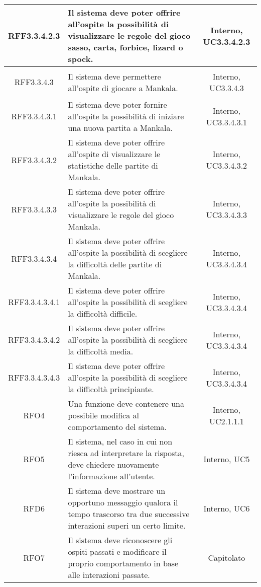 \begin{longtable}{|c|>{\centering}m{7cm}|c|}
	\hypertarget{RFF3.3.4.2.3}{RFF3.3.4.2.3} & Il sistema deve poter offrire all'ospite la possibilità di visualizzare le regole del gioco sasso, carta, forbice, lizard o spock. & Interno, UC3.3.4.2.3\\ \hline
	\hypertarget{RFF3.3.4.3}{RFF3.3.4.3} & Il sistema deve permettere all'ospite di giocare a Mankala. & Interno, UC3.3.4.3\\ \hline
	\hypertarget{RFF3.3.4.3.1}{RFF3.3.4.3.1} & Il sistema deve poter fornire all'ospite la possibilità di iniziare una nuova partita a Mankala. & Interno, UC3.3.4.3.1\\ \hline
	\hypertarget{RFF3.3.4.3.2}{RFF3.3.4.3.2} & Il sistema deve poter offrire all'ospite di visualizzare le statistiche delle partite di Mankala. & Interno, UC3.3.4.3.2\\ \hline
	\hypertarget{RFF3.3.4.3.3}{RFF3.3.4.3.3} & Il sistema deve poter offrire all'ospite la possibilità di visualizzare le regole del gioco Mankala. & Interno, UC3.3.4.3.3\\ \hline
	\hypertarget{RFF3.3.4.3.4}{RFF3.3.4.3.4} & Il sistema deve poter offrire all'ospite la possibilità di scegliere la difficoltà delle partite di Mankala. & Interno, UC3.3.4.3.4\\ \hline
	\hypertarget{RFF3.3.4.3.4.1}{RFF3.3.4.3.4.1} & Il sistema deve poter offrire all'ospite la possibilità di scegliere la difficoltà difficile. & Interno, UC3.3.4.3.4\\ \hline
	\hypertarget{RFF3.3.4.3.4.2}{RFF3.3.4.3.4.2} & Il sistema deve poter offrire all'ospite la possibilità di scegliere la difficoltà media. & Interno, UC3.3.4.3.4\\ \hline
	\hypertarget{RFF3.3.4.3.4.3}{RFF3.3.4.3.4.3} & Il sistema deve poter offrire all'ospite la possibilità di scegliere la difficoltà principiante. & Interno, UC3.3.4.3.4\\ \hline
	\hypertarget{RFO4}{RFO4} & Una funzione deve contenere una possibile modifica al comportamento del sistema. & Interno, UC2.1.1.1\\ \hline
	\hypertarget{RFO5}{RFO5} & Il sistema, nel caso in cui non riesca ad interpretare la risposta, deve chiedere nuovamente l'informazione all'utente. & Interno, UC5\\ \hline
	\hypertarget{RFD6}{RFD6} & Il sistema deve mostrare un opportuno messaggio qualora il tempo trascorso tra due successive interazioni superi un certo limite. & Interno, UC6\\ \hline
	\hypertarget{RFO7}{RFO7} & Il sistema deve riconoscere gli ospiti passati e modificare il proprio comportamento in base alle interazioni passate. & Capitolato\\ \hline

\end{longtable}
